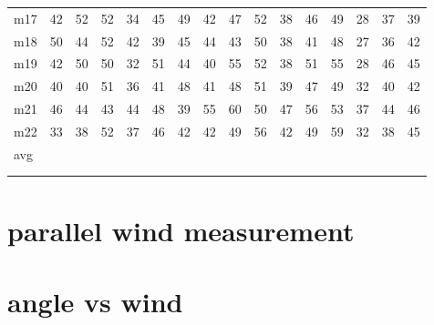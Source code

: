 \begin{table}[]
\begin{tabular}{l|l|l|l|l|l|l|l|l|l|l|l|l|lll}
m17  & 42     & 52     & 52    & 34     & 45     & 49    & 42     & 47     & 52    & 38     & 46     & 49    & \multicolumn{1}{l|}{28} & \multicolumn{1}{l|}{37} & 39 \\
m18  & 50     & 44     & 52    & 42     & 39     & 45    & 44     & 43     & 50    & 38     & 41     & 48    & \multicolumn{1}{l|}{27} & \multicolumn{1}{l|}{36} & 42 \\
m19  & 42     & 50     & 50    & 32     & 51     & 44    & 40     & 55     & 52    & 38     & 51     & 55    & \multicolumn{1}{l|}{28} & \multicolumn{1}{l|}{46} & 45 \\
m20  & 40     & 40     & 51    & 36     & 41     & 48    & 41     & 48     & 51    & 39     & 47     & 49    & \multicolumn{1}{l|}{32} & \multicolumn{1}{l|}{40} & 42 \\
m21  & 46     & 44     & 43    & 44     & 48     & 39    & 55     & 60     & 50    & 47     & 56     & 53    & \multicolumn{1}{l|}{37} & \multicolumn{1}{l|}{44} & 46 \\
m22  & 33     & 38     & 52    & 37     & 46     & 42    & 42     & 49     & 56    & 42     & 49     & 59    & \multicolumn{1}{l|}{32} & \multicolumn{1}{l|}{38} & 45 \\
avg  &        &        &       &        &        &       &        &        &       &        &        &       & \multicolumn{1}{l|}{}   & \multicolumn{1}{l|}{}   &    \\
     &        &        &       &        &        &       &        &        &       &        &        &       & \multicolumn{1}{l|}{}   & \multicolumn{1}{l|}{}   &    \\
     &        &        &       &        &        &       &        &        &       &        &        &       & \multicolumn{1}{l|}{}   & \multicolumn{1}{l|}{}   &   
\end{tabular}
\end{table}


\section{parallel wind measurement}\label{mes:kudo:par_mes}

\section{angle vs wind}\label{mes:kudo:relaton}